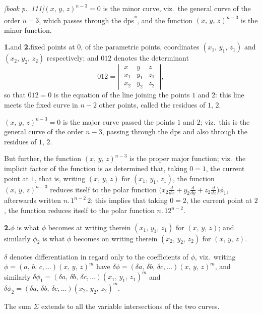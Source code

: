 \documentclass[11pt,a4paper]{article}
\theoremstyle{plain}
\theoremstyle{definition}
\theoremstyle{remark}
\begin{document}
\noindent\textit{[book p.~111]}\quad $(x,\,y,\,z)^{n-3} = 0$ is the minor curve, viz.\ the general curve of the order $n - 3$, which passes through the dps\textsuperscript{*}, and the function $(x,\,y,\,z)^{n-3}$ is the minor function.

\medskip\noindent\textbf{1.}\quad and \textbf{2.}\quad fixed points at $0$, of the parametric points, coordinates $(x_1,\,y_1,\,z_1)$ and $(x_2,\,y_2,\,z_2)$ respectively; and $012$ denotes the determinant
\[
012 = \left|\;
\begin{array}{ccc}
x  & y  & z  \\
x_1 & y_1 & z_1 \\
x_2 & y_2 & z_2
\end{array}\;\right|,
\]
so that $012 = 0$ is the equation of the line joining the points $1$ and $2$: this line meets the fixed curve in $n - 2$ other points, called the residues of $1$, $2$.

$(x,\,y,\,z)^{n-3} = 0$ is the major curve passed the points $1$ and $2$; viz.\ this is the general curve of the order $n - 3$, passing through the dps and also through the residues of $1$, $2$.

But further, the function $(x,\,y,\,z)^{n-3}$ is the proper major function; viz.\ the implicit factor of the function is as determined that, taking $0 = 1$, the current point at $1$, that is, writing $(x,\,y,\,z)$ for $(x_1,\,y_1,\,z_1)$, the function $(x,\,y,\,z)^{n-3}$ reduces itself to the polar function $\bigl(x_2\frac{d}{dx} + y_2\frac{d}{dy} + z_2\frac{d}{dz}\bigr)\phi_1$, afterwards written $n.\,1^{n-2}\,2$; this implies that taking $0 = 2$, the current point at $2$, the function reduces itself to the polar function $n.\,12^{n-2}$.

\medskip\noindent\textbf{2.}\quad $\phi$ is what $\phi$ becomes at writing therein $(x_1,\,y_1,\,z_1)$ for $(x,\,y,\,z)$; and similarly $\phi_2$ is what $\phi$ becomes on writing therein $(x_2,\,y_2,\,z_2)$ for $(x,\,y,\,z)$.

$\delta$ denotes differentiation in regard only to the coefficients of $\phi$, viz.\ writing $\phi = (a,\,b,\,c,\ldots)(x,\,y,\,z)^m$ have $\delta\phi = (\delta a,\,\delta b,\,\delta c,\ldots)(x,\,y,\,z)^m$, and similarly $\delta\phi_1 = (\delta a,\,\delta b,\,\delta c,\ldots)(x_1,\,y_1,\,z_1)^m$ and $\delta\phi_2 = (\delta a,\,\delta b,\,\delta c,\ldots)(x_2,\,y_2,\,z_2)^m$.

The sum $\Sigma$ extends to all the variable intersections of the two curves.
\end{document}

